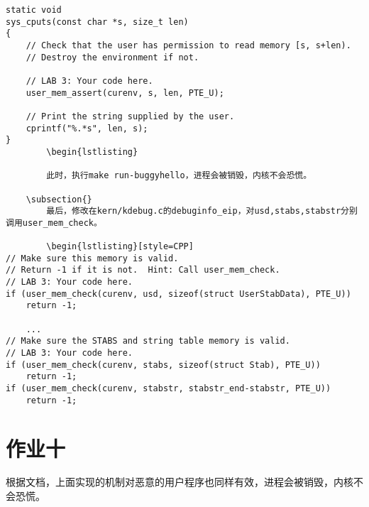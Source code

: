         \begin{lstlisting}[style=CPP]
static void
sys_cputs(const char *s, size_t len)
{
    // Check that the user has permission to read memory [s, s+len).
    // Destroy the environment if not.

    // LAB 3: Your code here.
    user_mem_assert(curenv, s, len, PTE_U);

    // Print the string supplied by the user.
    cprintf("%.*s", len, s);
}
        \begin{lstlisting}
        
        此时，执行make run-buggyhello，进程会被销毁，内核不会恐慌。

    \subsection{}
        最后，修改在kern/kdebug.c的debuginfo_eip，对usd,stabs,stabstr分别调用user_mem_check。

        \begin{lstlisting}[style=CPP]
// Make sure this memory is valid.
// Return -1 if it is not.  Hint: Call user_mem_check.
// LAB 3: Your code here.
if (user_mem_check(curenv, usd, sizeof(struct UserStabData), PTE_U))
    return -1;

    ...
// Make sure the STABS and string table memory is valid.
// LAB 3: Your code here.
if (user_mem_check(curenv, stabs, sizeof(struct Stab), PTE_U))
    return -1;
if (user_mem_check(curenv, stabstr, stabstr_end-stabstr, PTE_U))
    return -1;
        \end{lstlisting}

\section{作业十}
    根据文档，上面实现的机制对恶意的用户程序也同样有效，进程会被销毁，内核不会恐慌。
